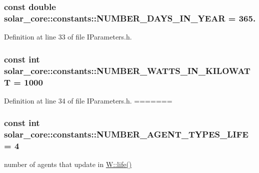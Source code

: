 \hypertarget{namespacesolar__core_1_1constants_ae81a48fc5b3417f74d5fc9b57cb023cd}{}
\subsubsection[{N\+U\+M\+B\+E\+R\+\_\+\+D\+A\+Y\+S\+\_\+\+I\+N\+\_\+\+Y\+E\+A\+R}]{\setlength{\rightskip}{0pt plus 5cm}const double solar\+\_\+core\+::constants\+::\+N\+U\+M\+B\+E\+R\+\_\+\+D\+A\+Y\+S\+\_\+\+I\+N\+\_\+\+Y\+E\+A\+R = 365.}\label{namespacesolar__core_1_1constants_ae81a48fc5b3417f74d5fc9b57cb023cd}


Definition at line 33 of file I\+Parameters.\+h.

\hypertarget{namespacesolar__core_1_1constants_adecfde74aa5d1f05002f04c42035bfd2}{}
\subsubsection[{N\+U\+M\+B\+E\+R\+\_\+\+W\+A\+T\+T\+S\+\_\+\+I\+N\+\_\+\+K\+I\+L\+O\+W\+A\+T\+T}]{\setlength{\rightskip}{0pt plus 5cm}const int solar\+\_\+core\+::constants\+::\+N\+U\+M\+B\+E\+R\+\_\+\+W\+A\+T\+T\+S\+\_\+\+I\+N\+\_\+\+K\+I\+L\+O\+W\+A\+T\+T = 1000}\label{namespacesolar__core_1_1constants_adecfde74aa5d1f05002f04c42035bfd2}


Definition at line 34 of file I\+Parameters.\+h.
=======
\subsubsection[{N\+U\+M\+B\+E\+R\+\_\+\+A\+G\+E\+N\+T\+\_\+\+T\+Y\+P\+E\+S\+\_\+\+L\+I\+F\+E}]{\setlength{\rightskip}{0pt plus 5cm}const int solar\+\_\+core\+::constants\+::\+N\+U\+M\+B\+E\+R\+\_\+\+A\+G\+E\+N\+T\+\_\+\+T\+Y\+P\+E\+S\+\_\+\+L\+I\+F\+E = 4}\label{namespacesolar__core_1_1constants_a2ec52da705235aa418b0def4e509ef81}
number of agents that update in \hyperlink{classsolar__core_1_1_w_a5e64e5a7ef41c07fddf7994cd3f2693e}{W\+::life()} 

